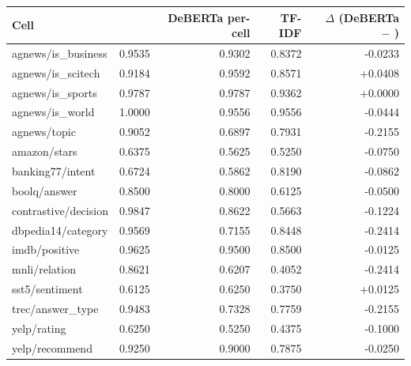 \begin{widetable}
\centering
\footnotesize
\caption{Per-cell accuracy on the 1{,}176 test bundles: \vsix{}, the same-backbone per-cell
classifier (seed 42, two epochs) and the supervised TF-IDF reference. The last column is the
classifier minus \vsix{}.}
\label{tab:percell_baselines}
\begin{tabular}{lrrrr}
\toprule
Cell & \vsix{} & DeBERTa per-cell & TF-IDF & $\Delta$ (DeBERTa $-$ \vsix{}) \\
\midrule
agnews/is\_business & 0.9535 & 0.9302 & 0.8372 & -0.0233 \\
agnews/is\_scitech & 0.9184 & 0.9592 & 0.8571 & +0.0408 \\
agnews/is\_sports & 0.9787 & 0.9787 & 0.9362 & +0.0000 \\
agnews/is\_world & 1.0000 & 0.9556 & 0.9556 & -0.0444 \\
agnews/topic & 0.9052 & 0.6897 & 0.7931 & -0.2155 \\
amazon/stars & 0.6375 & 0.5625 & 0.5250 & -0.0750 \\
banking77/intent & 0.6724 & 0.5862 & 0.8190 & -0.0862 \\
boolq/answer & 0.8500 & 0.8000 & 0.6125 & -0.0500 \\
contrastive/decision & 0.9847 & 0.8622 & 0.5663 & -0.1224 \\
dbpedia14/category & 0.9569 & 0.7155 & 0.8448 & -0.2414 \\
imdb/positive & 0.9625 & 0.9500 & 0.8500 & -0.0125 \\
mnli/relation & 0.8621 & 0.6207 & 0.4052 & -0.2414 \\
sst5/sentiment & 0.6125 & 0.6250 & 0.3750 & +0.0125 \\
trec/answer\_type & 0.9483 & 0.7328 & 0.7759 & -0.2155 \\
yelp/rating & 0.6250 & 0.5250 & 0.4375 & -0.1000 \\
yelp/recommend & 0.9250 & 0.9000 & 0.7875 & -0.0250 \\
\bottomrule
\end{tabular}
\end{widetable}

